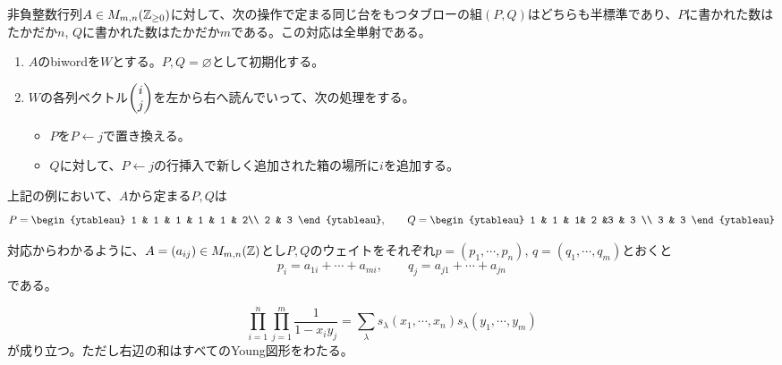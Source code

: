 \documentclass{ltjsreport}
\begin{document}
\begin{theo}[RSK対応]
  非負整数行列$A\in M_{m,n}(\mathbb{Z}_{\geq 0})$に対して、次の操作で定まる同じ台をもつタブローの組$(P,Q)$はどちらも半標準であり、$P$に書かれた数はたかだか$n$, $Q$に書かれた数はたかだか$m$である。この対応は全単射である。
  \begin{enumerate}
    \item $A$のbiwordを$W$とする。$P,Q=\varnothing$として初期化する。
    \item $W$の各列ベクトル$\begin{pmatrix} i\\j \end{pmatrix}$を左から右へ読んでいって、次の処理をする。
    \begin{itemize}
      \item $P$を$P\leftarrow j$で置き換える。
      \item $Q$に対して、$P\leftarrow j$の行挿入で新しく追加された箱の場所に$i$を追加する。
    \end{itemize}
  \end{enumerate}
\end{theo}

\begin{eg}
  上記の例において、$A$から定まる$P,Q$は
  \[
  P=\begin{ytableau}
    1 & 1 & 1 & 1 & 1 & 2\\
    2 & 3
  \end{ytableau},\qquad
  Q=\begin{ytableau}
    1 & 1 & 1& 2 &3 & 3 \\
    3 & 3
  \end{ytableau}
  \]
\end{eg}

対応からわかるように、$A=(a_{ij})\in M_{m,n}(\mathbb{Z})$とし$P,Q$のウェイトをそれぞれ$p=(p_1,\cdots,p_n)$, $q=(q_1,\cdots,q_m)$とおくと
\begin{equation}\label{weight_and_matrix}
p_i=a_{1i}+\cdots+a_{mi},\qquad q_j=a_{j1}+\cdots+a_{jn}  
\end{equation}
である。

\begin{theo}[Cauchyの等式]
  \[
  \prod_{i=1}^n\prod_{j=1}^m\frac{1}{1-x_iy_j}=\sum_{\lambda}s_\lambda(x_1,\cdots,x_n)s_\lambda(y_1,\cdots,y_m)  
  \]
  が成り立つ。ただし右辺の和はすべてのYoung図形をわたる。
\end{theo}
\end{document}

